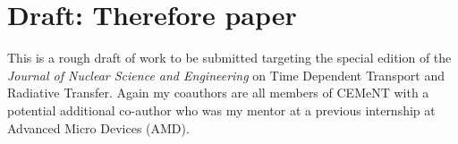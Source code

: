 \label{app:hybridmcatk}


\section{Draft: Therefore paper}
\label{app:therefore}

This is a rough draft of work to be submitted targeting the special edition of the \textit{Journal of Nuclear Science and Engineering} on Time Dependent Transport and Radiative Transfer.
Again my coauthors are all members of CEMeNT with a potential additional co-author who was my mentor at a previous internship at Advanced Micro Devices (AMD).


